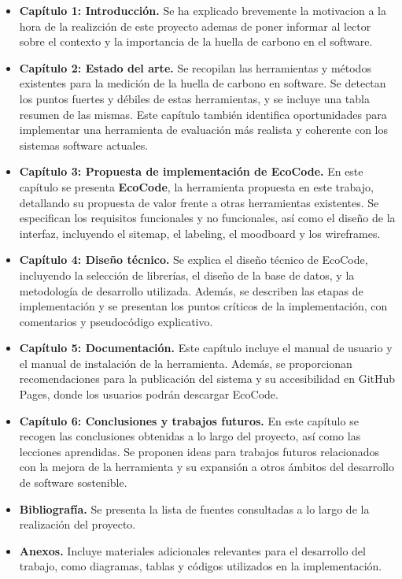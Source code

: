 \documentclass[12pt,a4paper]{report}
\begin{document}
\begin{itemize}
    \item \textbf{Capítulo 1: Introducción.} Se ha explicado brevemente la motivacion a la hora de la realizción de este proyecto ademas de poner informar al lector sobre el contexto y la importancia de la huella 
    de carbono en el software.
    \item \textbf{Capítulo 2: Estado del arte.} Se recopilan las herramientas y métodos existentes para la medición de la huella de carbono en software. Se detectan los puntos fuertes y débiles de estas herramientas, y se incluye una tabla resumen de las mismas. Este capítulo también identifica oportunidades para implementar una herramienta de evaluación más realista y coherente con los sistemas software actuales.
    \item \textbf{Capítulo 3: Propuesta de implementación de EcoCode.} En este capítulo se presenta \textbf{EcoCode}, la herramienta propuesta en este trabajo, detallando su propuesta de valor frente a otras herramientas existentes. Se especifican los requisitos funcionales y no funcionales, así como el diseño de la interfaz, incluyendo el sitemap, el labeling, el moodboard y los wireframes.
    \item \textbf{Capítulo 4: Diseño técnico.} Se explica el diseño técnico de EcoCode, incluyendo la selección de librerías, el diseño de la base de datos, y la metodología de desarrollo utilizada. Además, se describen las etapas de implementación y se presentan los puntos críticos de la implementación, con comentarios y pseudocódigo explicativo.
    \item \textbf{Capítulo 5: Documentación.} Este capítulo incluye el manual de usuario y el manual de instalación de la herramienta. Además, se proporcionan recomendaciones para la publicación del sistema y su accesibilidad en GitHub Pages, donde los usuarios podrán descargar EcoCode.
    \item \textbf{Capítulo 6: Conclusiones y trabajos futuros.} En este capítulo se recogen las conclusiones obtenidas a lo largo del proyecto, así como las lecciones aprendidas. Se proponen ideas para trabajos futuros relacionados con la mejora de la herramienta y su expansión a otros ámbitos del desarrollo de software sostenible.
    \item \textbf{Bibliografía.} Se presenta la lista de fuentes consultadas a lo largo de la realización del proyecto.
    \item \textbf{Anexos.} Incluye materiales adicionales relevantes para el desarrollo del trabajo, como diagramas, tablas y códigos utilizados en la implementación.
\end{itemize}
\end{document}
